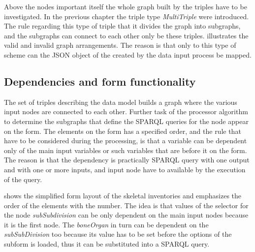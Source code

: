 

Above the nodes important itself the whole graph built by the triples have to be investigated. In the previous chapter the triple type \textit{MultiTriple} were introduced. The rule regarding this type of triple that it divides the graph into subgraphs, and the subgraphs can connect to each other only be these triples.  illustrates the valid and invalid graph arrangements. The reason is that only to this type of scheme can the JSON object of the created by the data input process be mapped.


\subsection{Dependencies and form functionality}  \label{512}


The set of triples describing the data model builds a graph where the various input nodes are connected to each other. Further task of the processor algorithm to determine the subgraphs that define the SPARQL queries for the node appear on the form. The elements on the form has a specified order, and the rule that have to be considered during the processing, is that a variable can be dependent only of the main input variables or such variables that are before it on the form. The reason is that the dependency is practically SPARQL query with one output and with one or more inputs, and input node have to available by the execution of the query.


 shows the simplified form layout of the skeletal inventories and emphasizes the order of the elements with the number. The idea is that values of the selector for the node \textit{subSubdivision} can be only dependent on the main input nodes because it is the first node. The \textit{boneOrgan} in turn can be dependent on the \textit{subSubDivision} too because its value has to be set before the options of the subform is loaded, thus it can be substituted into a SPARQL query.




